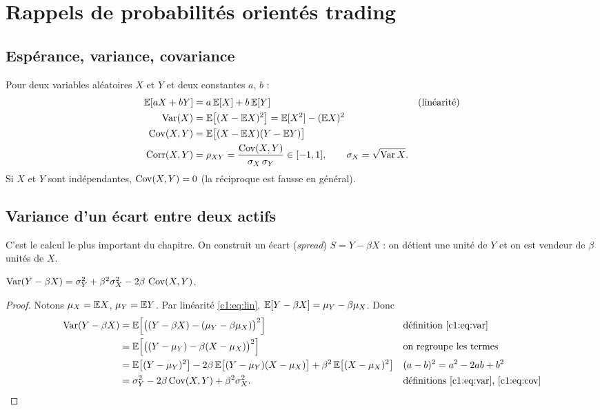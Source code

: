 \section{Rappels de probabilités orientés trading}

\subsection{Espérance, variance, covariance}

Pour deux variables aléatoires $X$ et $Y$ et deux constantes $a$, $b$ :
\begin{align}
\mathbb{E}[aX + bY] &= a\,\mathbb{E}[X] + b\,\mathbb{E}[Y] && \text{(linéarité)}\label{c1:eq:lin}\\
\operatorname{Var}(X) &= \mathbb{E}\big[(X-\mathbb{E} X)^2\big] = \mathbb{E}[X^2] - (\mathbb{E} X)^2 \label{c1:eq:var}\\
\operatorname{Cov}(X,Y) &= \mathbb{E}\big[(X-\mathbb{E} X)(Y-\mathbb{E} Y)\big] \label{c1:eq:cov}\\
\operatorname{Corr}(X,Y) &= \rho_{XY} = \frac{\operatorname{Cov}(X,Y)}{\sigma_X\,\sigma_Y} \in [-1,1], \qquad \sigma_X = \sqrt{\operatorname{Var} X}. \label{c1:eq:corr}
\end{align}
Si $X$ et $Y$ sont indépendantes, $\operatorname{Cov}(X,Y)=0$ (la réciproque est fausse en général).

\subsection{Variance d'un écart entre deux actifs}

C'est le calcul le plus important du chapitre. On construit un écart (\emph{spread}) $S = Y - \beta X$ : on détient une unité de $Y$ et on est vendeur de $\beta$ unités de $X$.

\begin{proposition}\label{c1:prop:varspread}
$\operatorname{Var}(Y - \beta X) = \sigma_Y^2 + \beta^2\sigma_X^2 - 2\beta\,\operatorname{Cov}(X,Y)$.
\end{proposition}
\begin{proof}
Notons $\mu_X = \mathbb{E} X$, $\mu_Y = \mathbb{E} Y$. Par linéarité \eqref{c1:eq:lin}, $\mathbb{E}[Y-\beta X] = \mu_Y - \beta\mu_X$. Donc
\begin{align*}
\operatorname{Var}(Y-\beta X) &= \mathbb{E}\Big[\big((Y-\beta X) - (\mu_Y - \beta\mu_X)\big)^2\Big] && \text{définition \eqref{c1:eq:var}}\\
&= \mathbb{E}\Big[\big((Y-\mu_Y) - \beta(X-\mu_X)\big)^2\Big] && \text{on regroupe les termes}\\
&= \mathbb{E}\big[(Y-\mu_Y)^2\big] - 2\beta\,\mathbb{E}\big[(Y-\mu_Y)(X-\mu_X)\big] + \beta^2\,\mathbb{E}\big[(X-\mu_X)^2\big] && (a-b)^2 = a^2 - 2ab + b^2\\
&= \sigma_Y^2 - 2\beta\operatorname{Cov}(X,Y) + \beta^2\sigma_X^2. && \text{définitions \eqref{c1:eq:var}, \eqref{c1:eq:cov}}
\end{align*}
\end{proof}

